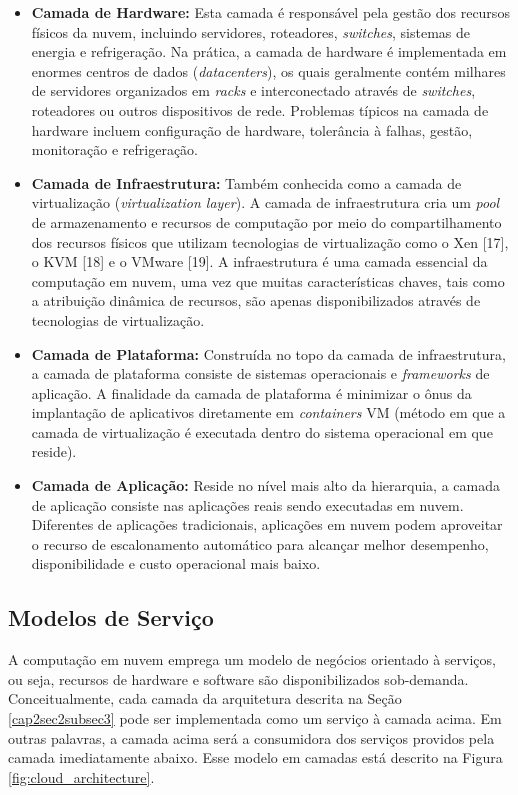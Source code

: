 \begin{itemize}
	\item \textbf{Camada de Hardware:} Esta camada é responsável pela gestão dos recursos físicos da nuvem, incluindo servidores, roteadores, \textit{switches}, sistemas de energia e refrigeração. Na prática, a camada de hardware é implementada em enormes centros de dados (\textit{datacenters}), os quais geralmente contém milhares de servidores organizados em \textit{racks} e interconectado através de \textit{switches}, roteadores ou outros dispositivos de rede. Problemas típicos na camada de hardware incluem configuração de hardware, tolerância à falhas, gestão, monitoração e refrigeração.
    \item \textbf{Camada de Infraestrutura:} Também conhecida como a camada de virtualização (\textit{virtualization layer}). A camada de infraestrutura cria um \textit{pool} de armazenamento e recursos de computação por meio do compartilhamento dos recursos físicos que utilizam tecnologias de virtualização como o Xen [17], o KVM [18] e o VMware [19]. A infraestrutura é uma camada essencial da computação em nuvem, uma vez que muitas características chaves, tais como a atribuição dinâmica de recursos, são apenas disponibilizados através de tecnologias de virtualização.
    \item \textbf{Camada de Plataforma:} Construída no topo da camada de infraestrutura, a camada de plataforma consiste de sistemas operacionais e \textit{frameworks} de aplicação. A finalidade da camada de plataforma é minimizar o ônus da implantação de aplicativos diretamente em \textit{containers} VM (método em que a camada de virtualização é executada dentro do sistema operacional em que reside).
    \item \textbf{Camada de Aplicação:} Reside no nível mais alto da hierarquia, a camada de aplicação consiste nas aplicações reais sendo executadas em nuvem. Diferentes de aplicações tradicionais, aplicações em nuvem podem aproveitar o recurso de escalonamento automático para alcançar melhor desempenho, disponibilidade e custo operacional mais baixo.
\end{itemize}

\subsection{Modelos de Serviço} \label{cap2sec2subsec4}

A computação em nuvem emprega um modelo de negócios orientado à serviços, ou seja, recursos de hardware e software são disponibilizados sob-demanda. Conceitualmente, cada camada da arquitetura descrita na Seção \ref{cap2sec2subsec3} pode ser implementada como um serviço à camada acima. Em outras palavras, a camada acima será a consumidora dos serviços providos pela camada imediatamente abaixo. Esse modelo em camadas está descrito na Figura \ref{fig:cloud_architecture}.

